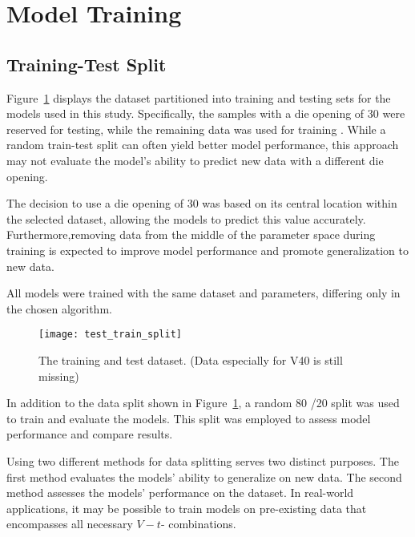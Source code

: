 \section{Model Training}\label{sec:model-training}

\subsection{Training-Test Split}\label{subsec:training-test-split}
Figure~\ref{fig:train_test_split} displays the dataset partitioned into training and
testing sets for the models used in this study.
Specifically, the samples with a die
opening of 30 were reserved for testing, while the remaining data was used for training .
While a random train-test split can often yield better model performance, this
approach may not evaluate the model's ability to predict new data with a different die
opening.

The decision to use a die opening of 30 was based on its central location within the
selected dataset, allowing the models to predict this value accurately.
Furthermore,removing data from the middle of the parameter space during training is
expected to improve model performance and promote generalization to new data.

All models were trained with the same dataset and parameters, differing only in the
chosen algorithm.


\begin{figure}[H]
    \begin{tcolorbox}[arc=0pt,boxrule=0.5pt]
        \centering
        \texttt{[image: test\_train\_split]}
        \caption{The training and test dataset. (Data especially for V40 is
        still missing)}
        \label{fig:train_test_split}
    \end{tcolorbox}
\end{figure}

In addition to the data split shown in Figure~\ref{fig:train_test_split}, a random 80
/20 split was used to train and evaluate the models.
This split was employed to assess model performance and compare results.

Using two different methods for data splitting serves two distinct purposes.
The first method evaluates the models' ability to generalize on new data.
The second method assesses the models' performance on the dataset.
In real-world applications, it may be possible to train models on pre-existing data
that encompasses all necessary $V-t$-
combinations.

